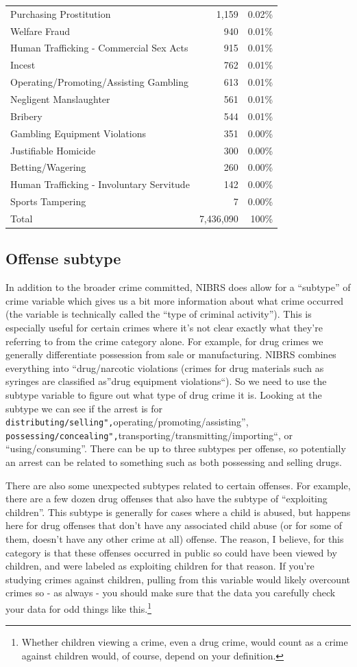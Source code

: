 \documentclass[
  12pt,
  openany]{book}
\begin{document}
\begin{longtable}[]{@{}lrr@{}}
Purchasing Prostitution & 1,159 & 0.02\%\tabularnewline
Welfare Fraud & 940 & 0.01\%\tabularnewline
Human Trafficking - Commercial Sex Acts & 915 & 0.01\%\tabularnewline
Incest & 762 & 0.01\%\tabularnewline
Operating/Promoting/Assisting Gambling & 613 & 0.01\%\tabularnewline
Negligent Manslaughter & 561 & 0.01\%\tabularnewline
Bribery & 544 & 0.01\%\tabularnewline
Gambling Equipment Violations & 351 & 0.00\%\tabularnewline
Justifiable Homicide & 300 & 0.00\%\tabularnewline
Betting/Wagering & 260 & 0.00\%\tabularnewline
Human Trafficking - Involuntary Servitude & 142 & 0.00\%\tabularnewline
Sports Tampering & 7 & 0.00\%\tabularnewline
Total & 7,436,090 & 100\%\tabularnewline
\bottomrule
\end{longtable}

\hypertarget{offense-subtype}{%
\subsection{Offense subtype}\label{offense-subtype}}

In addition to the broader crime committed, NIBRS does allow for a ``subtype'' of crime variable which gives us a bit more information about what crime occurred (the variable is technically called the ``type of criminal activity''). This is especially useful for certain crimes where it's not clear exactly what they're referring to from the crime category alone. For example, for drug crimes we generally differentiate possession from sale or manufacturing. NIBRS combines everything into ``drug/narcotic violations (crimes for drug materials such as syringes are classified as''drug equipment violations``). So we need to use the subtype variable to figure out what type of drug crime it is. Looking at the subtype we can see if the arrest is for \texttt{distributing/selling",}operating/promoting/assisting'', \texttt{possessing/concealing",}transporting/transmitting/importing``, or ``using/consuming''. There can be up to three subtypes per offense, so potentially an arrest can be related to something such as both possessing and selling drugs.

There are also some unexpected subtypes related to certain offenses. For example, there are a few dozen drug offenses that also have the subtype of ``exploiting children''. This subtype is generally for cases where a child is abused, but happens here for drug offenses that don't have any associated child abuse (or for some of them, doesn't have any other crime at all) offense. The reason, I believe, for this category is that these offenses occurred in public so could have been viewed by children, and were labeled as exploiting children for that reason. If you're studying crimes against children, pulling from this variable would likely overcount crimes so - as always - you should make sure that the data you carefully check your data for odd things like this.\footnote{Whether children viewing a crime, even a drug crime, would count as a crime against children would, of course, depend on your definition.}
\end{document}

